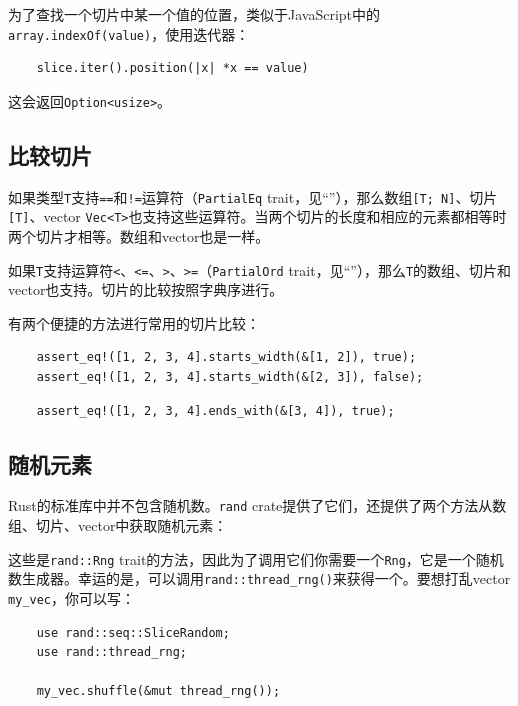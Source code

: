 为了查找一个切片中某一个值的位置，类似于JavaScript中的\texttt{array.indexOf(value)}，使用迭代器：
\begin{verbatim}
    slice.iter().position(|x| *x == value)
\end{verbatim}
这会返回\texttt{Option<usize>}。

\subsection{比较切片}
如果类型\texttt{T}支持\texttt{==}和\texttt{!=}运算符（\texttt{PartialEq} trait，见“”），那么数组\texttt{[T; N]}、切片\texttt{[T]}、vector \texttt{Vec<T>}也支持这些运算符。当两个切片的长度和相应的元素都相等时两个切片才相等。数组和vector也是一样。

如果\texttt{T}支持运算符\texttt{<}、\texttt{<=}、\texttt{>}、\texttt{>=}（\texttt{PartialOrd} trait，见“”），那么\texttt{T}的数组、切片和vector也支持。切片的比较按照字典序进行。

有两个便捷的方法进行常用的切片比较：

\begin{verbatim}
    assert_eq!([1, 2, 3, 4].starts_width(&[1, 2]), true);
    assert_eq!([1, 2, 3, 4].starts_width(&[2, 3]), false);
\end{verbatim}

\begin{verbatim}
    assert_eq!([1, 2, 3, 4].ends_with(&[3, 4]), true);
\end{verbatim}

\subsection{随机元素}
Rust的标准库中并不包含随机数。\texttt{rand} crate提供了它们，还提供了两个方法从数组、切片、vector中获取随机元素：



这些是\texttt{rand::Rng} trait的方法，因此为了调用它们你需要一个\texttt{Rng}，它是一个随机数生成器。幸运的是，可以调用\texttt{rand::thread\_rng()}来获得一个。要想打乱vector \texttt{my\_vec}，你可以写：
\begin{verbatim}
    use rand::seq::SliceRandom;
    use rand::thread_rng;

    my_vec.shuffle(&mut thread_rng());
\end{verbatim}

